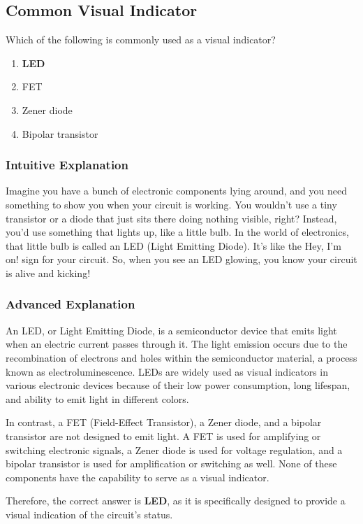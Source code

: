 \subsection{Common Visual Indicator}
\label{T6D07}

\begin{tcolorbox}[colback=gray!10!white,colframe=black!75!black,title=T6D07]
Which of the following is commonly used as a visual indicator?
\begin{enumerate}[label=\Alph*)]
    \item \textbf{LED}
    \item FET
    \item Zener diode
    \item Bipolar transistor
\end{enumerate}
\end{tcolorbox}

\subsubsection{Intuitive Explanation}
Imagine you have a bunch of electronic components lying around, and you need something to show you when your circuit is working. You wouldn't use a tiny transistor or a diode that just sits there doing nothing visible, right? Instead, you'd use something that lights up, like a little bulb. In the world of electronics, that little bulb is called an LED (Light Emitting Diode). It’s like the Hey, I'm on! sign for your circuit. So, when you see an LED glowing, you know your circuit is alive and kicking!

\subsubsection{Advanced Explanation}
An LED, or Light Emitting Diode, is a semiconductor device that emits light when an electric current passes through it. The light emission occurs due to the recombination of electrons and holes within the semiconductor material, a process known as electroluminescence. LEDs are widely used as visual indicators in various electronic devices because of their low power consumption, long lifespan, and ability to emit light in different colors.

In contrast, a FET (Field-Effect Transistor), a Zener diode, and a bipolar transistor are not designed to emit light. A FET is used for amplifying or switching electronic signals, a Zener diode is used for voltage regulation, and a bipolar transistor is used for amplification or switching as well. None of these components have the capability to serve as a visual indicator.

Therefore, the correct answer is \textbf{LED}, as it is specifically designed to provide a visual indication of the circuit's status.

